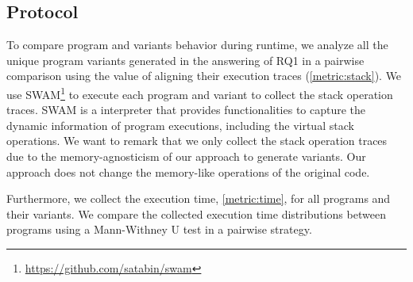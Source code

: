 \subsection*{Protocol}

To compare program and variants behavior during runtime, we analyze all the unique program variants generated in the answering of RQ1 in a pairwise comparison using the value of aligning their execution traces (\autoref{metric:stack}). We use SWAM\footnote{\url{https://github.com/satabin/swam}} to execute each program and variant to collect the stack operation traces. SWAM is a \wasm interpreter that provides functionalities to capture the dynamic information of \wasm program executions, including the virtual stack operations. We want to remark that we only collect the stack operation traces due to the memory-agnosticism of our approach to generate variants. Our approach does not change the memory-like operations of the original code.

Furthermore, we collect the execution time, \autoref{metric:time}, for all programs and their variants. We compare the collected execution time distributions between programs using a Mann-Withney U test \cite{mann1947} in a pairwise strategy.


 